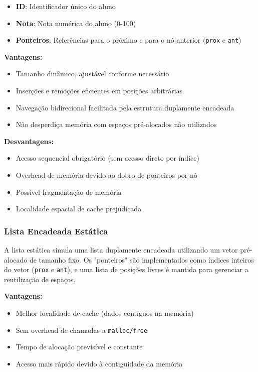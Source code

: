\documentclass[conference]{IEEEtran}
\begin{document}
\begin{itemize}
    \item \textbf{ID}: Identificador único do aluno
    \item \textbf{Nota}: Nota numérica do aluno (0-100)
    \item \textbf{Ponteiros}: Referências para o próximo e para o nó anterior (\texttt{prox} e \texttt{ant})
\end{itemize}

\textbf{Vantagens:}
\begin{itemize}
    \item Tamanho dinâmico, ajustável conforme necessário
    \item Inserções e remoções eficientes em posições arbitrárias
    \item Navegação bidirecional facilitada pela estrutura duplamente encadeada
    \item Não desperdiça memória com espaços pré-alocados não utilizados
\end{itemize}

\textbf{Desvantagens:}
\begin{itemize}
    \item Acesso sequencial obrigatório (sem acesso direto por índice)
    \item Overhead de memória devido ao dobro de ponteiros por nó
    \item Possível fragmentação de memória
    \item Localidade espacial de cache prejudicada
\end{itemize}

\subsubsection{Lista Encadeada Estática}

A lista estática simula uma lista duplamente encadeada utilizando um vetor pré-alocado de tamanho fixo. Os "ponteiros" são implementados como índices inteiros do vetor (\texttt{prox} e \texttt{ant}), e uma lista de posições livres é mantida para gerenciar a reutilização de espaços.

\textbf{Vantagens:}
\begin{itemize}
    \item Melhor localidade de cache (dados contíguos na memória)
    \item Sem overhead de chamadas a \texttt{malloc/free}
    \item Tempo de alocação previsível e constante
    \item Acesso mais rápido devido à contiguidade da memória
\end{itemize}
\end{document}
